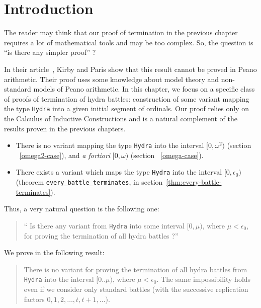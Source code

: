 \section{Introduction}
The reader may think that our proof of termination in the previous  chapter requires a lot of mathematical tools and may be too  complex. So, the question is ``is there  any  simpler proof'' ?

In their article~\cite{KP82}, Kirby and Paris show that this result cannot be proved in Peano arithmetic. Their proof uses some knowledge about model theory and non-standard models of Peano arithmetic. In this chapter, we focus on a specific class of proofs of termination of hydra battles: construction of some variant mapping the type \texttt{Hydra} into a given initial  segment of ordinals. Our proof relies only on the Calculus of Inductive Constructions and is a natural complement of the results proven in the previous chapters.

\begin{itemize}
\item There is no variant mapping the type \texttt{Hydra} into the interval $[0,\omega^2)$ (section ~\vref{omega2-case}), and \emph{a fortiori} $[0,\omega)$ (section ~\vref{omega-case}).

\item There exists a variant which maps the type \texttt{Hydra} into the
interval $[0,\epsilon_0)$ (theorem \texttt{every\_battle\_terminates}, in section~\vref{thm:every-battle-terminates}).
\end{itemize}


Thus, a very natural question is the following one:
\begin{quote}
  `` Is there  any variant from
\texttt{Hydra} into some interval $[0,\mu)$, where $\mu<\epsilon_0$, for proving the termination of all hydra battles ?''
\end{quote}

We prove in \coq{} the following result:

\begin{quote}
There is no variant for proving the termination of all hydra battles
from \texttt{Hydra} into the interval $[0..\mu)$, where
$\mu< \epsilon_0$.
The same impossibility holds even if we consider only standard battles (with the successive replication factors $0,1,2,\dots,t,t+1,\dots$).
\end{quote}

